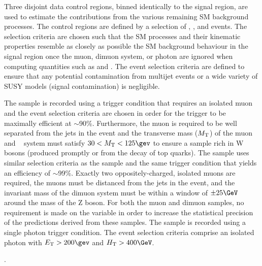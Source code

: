 
Three disjoint data control regions, binned identically to the signal
region, are used to estimate the contributions from the various
remaining SM background processes. The control regions are defined by
a selection of \mj, \mmj, and \gj events. The selection criteria are
chosen such that the SM processes and their kinematic properties
resemble as closely as possible the SM background behaviour in the
signal region once the muon, dimuon system, or photon are ignored when
computing quantities such as \scalht and \alphat. 
The event selection criteria are defined to ensure that any potential
contamination from multijet events or a wide variety of SUSY models
(\ie signal contamination) is negligible.

The \mj sample is recorded using a trigger condition that requires an
isolated muon and the event selection criteria are chosen in order for
the trigger to be maximally efficient at $\sim$90\%. Furthermore, the
muon is required to be well separated from the jets in the event and
the transverse mass ($M_{\rm T}$) of the muon and
\met~\cite{CMS-PAS-PFT-09-001, CMS-PAS-PFT-10-001} system must satisfy
$30 < M_{\rm T} < 125\gev$ to ensure a sample rich in W bosons
(produced promptly or from the decay of top quarks). The \mmj sample
uses similar selection criteria as the \mj sample and the same trigger
condition that yields an efficiency of $\sim$99\%. Exactly two
oppositely-charged, isolated muons are required, the muons must be
distanced from the jets in the event, and the invariant mass of the
dimuon system must be within a window of $\pm 25\GeV$ around the mass
of the Z boson. For both the muon and dimuon samples, no requirement
is made on the variable \alphat in order to increase the statistical
precision of the predictions derived from these samples.  The \gj
sample is recorded using a single photon trigger condition. The event
selection criteria comprise an isolated photon with $\Et > 200\gev$ and
$\scalht > 400\GeV$.%

.

